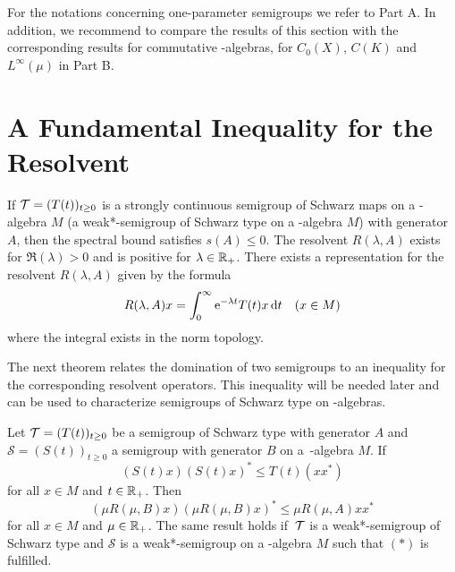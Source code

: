 For the notations concerning one-parameter semigroups we refer to Part A.
In addition, we recommend to compare the results of this section with the corresponding results for commutative \CA-algebras, \ie for $ C_{0}(X) $, $ C(K) $ and $ L^\infty(\mu) $ in Part B.
\section{A Fundamental Inequality for the Resolvent}\label{sec:d1-2}
If $ \mathcal{T} = (T(t))_{t \geq 0} $ is a strongly continuous semigroup of Schwarz maps on a \CA-algebra $ M $ (\resp a weak*-semigroup of Schwarz type on a \WA-algebra $ M $) with generator $ A $, then the spectral bound satisfies $ s(A) \leq 0 $.
The resolvent $ R(\lambda, A) $ exists for $ \Re(\lambda) > 0 $ and is positive for $ \lambda \in \mathbb{R}_{+} $.
There exists a representation for the resolvent $ R(\lambda,A) $ given by the formula
\[
 	R(\lambda,A)x = \int_{0}^\infty \mathrm{e}^{-\lambda t} T(t)x  \mathop{}\!\mathrm{d}{t}  \quad (x \in M)
\]
where the integral exists in the norm topology.

The next theorem relates the domination of two semigroups to an inequality for the corresponding resolvent operators.
This inequality will be needed later and can be used to characterize semigroups of Schwarz type on \CA-algebras.
\begin{theorem}\label{thm:d1-2.1}
Let $  \mathcal{T}  = (T(t))_{t\geq0} $ be a semigroup of Schwarz type with generator $ A $ and $ \mathcal{S} = (S(t))_{t\geq0} $ a semigroup with generator $ B $ on a\, \CA-algebra $ M $.
If
\begin{equation}
	(S(t)x)(S(t)x)^{*} \leq T(t)(xx^{*}) \tag{*}
\end{equation}
for all $ x \in M $ and $ t \in \mathbb{R}_{+} $. 
Then 
\[
	\left( \mu R(\mu,B)x \right) \left( \mu R(\mu,B)x \right)^{*} \leq \mu R(\mu,A)xx^{*}
\]
for all $ x \in M $ and $ \mu \in \mathbb{R}_{+} $.
The same result holds if $ \,\mathcal{T} $ is a weak*-semigroup of Schwarz type and $ \mathcal{S} $ is a weak*-semigroup on a \WA-algebra $ M $ such that $ (*) $ is fulfilled.
\end{theorem}

